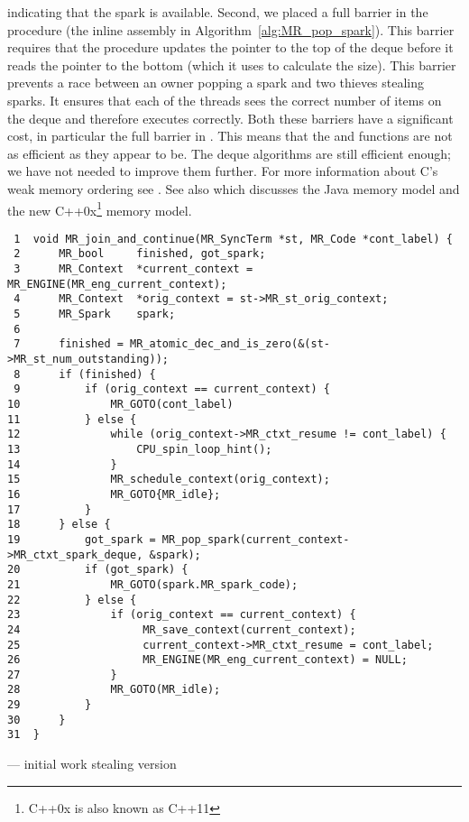 indicating that the spark is available.
Second, we placed a full barrier in the \pop procedure
(the inline assembly in Algorithm~\ref{alg:MR_pop_spark}).
This barrier requires that the procedure updates the pointer to the top of the
deque before it reads the pointer to the bottom (which it uses to
calculate the size).
This barrier prevents a race between an owner popping a spark and two
thieves stealing sparks.
It ensures that each of the threads sees the correct number of items on the
deque and therefore executes correctly.
Both these barriers have a significant cost,
in particular the full barrier in \pop.
This means that the \push and \pop functions are not as efficient as they
appear to be.
The deque algorithms are still efficient enough;
we have not needed to improve them further.
For more information about C's weak memory ordering see
\citet{Boehm:2005:threads-as-a-library}.
See also \citet{Adve:2010:memory-models} which discusses the Java memory
model and the new C++0x\footnote{C++0x is also known as C++11} memory model.

\begin{algorithm}[tbp]
\begin{verbatim}
 1  void MR_join_and_continue(MR_SyncTerm *st, MR_Code *cont_label) {
 2      MR_bool     finished, got_spark;
 3      MR_Context  *current_context = MR_ENGINE(MR_eng_current_context); 
 4      MR_Context  *orig_context = st->MR_st_orig_context;
 5      MR_Spark    spark;
 6
 7      finished = MR_atomic_dec_and_is_zero(&(st->MR_st_num_outstanding));
 8      if (finished) {
 9          if (orig_context == current_context) {
10              MR_GOTO(cont_label)
11          } else {
12              while (orig_context->MR_ctxt_resume != cont_label) {
13                  CPU_spin_loop_hint();
14              }
15              MR_schedule_context(orig_context);
16              MR_GOTO{MR_idle};
17          }
18      } else {
19          got_spark = MR_pop_spark(current_context->MR_ctxt_spark_deque, &spark);
20          if (got_spark) {
21              MR_GOTO(spark.MR_spark_code);
22          } else {
23              if (orig_context == current_context) {
24                   MR_save_context(current_context);
25                   current_context->MR_ctxt_resume = cont_label;
26                   MR_ENGINE(MR_eng_current_context) = NULL;
27              }
28              MR_GOTO(MR_idle);
29          }
30      }
31  }    
\end{verbatim}
\caption{\joinandcontinue --- initial work stealing version}
\label{alg:join_and_continue_ws1}
\end{algorithm}

